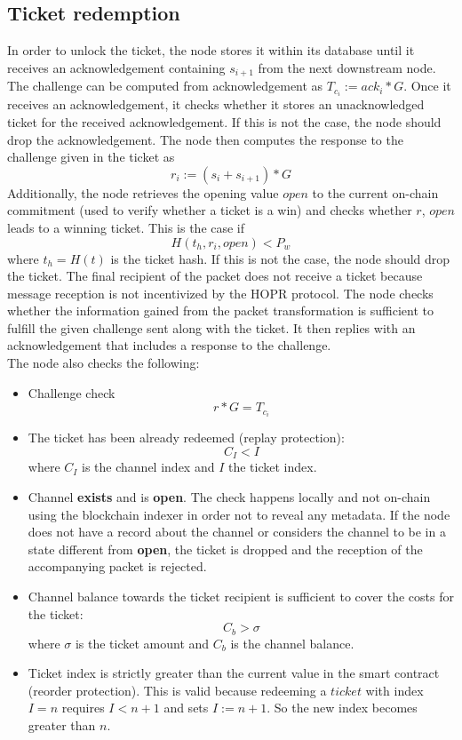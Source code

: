 \subsection{Ticket redemption}


In order to unlock the ticket, the node stores it within its database until it receives an acknowledgement containing $s_{i+1}$ from the next downstream node. 
The challenge can be computed from acknowledgement as $T_{c_i}:=ack_i*G$.
\newline Once it receives an acknowledgement, it checks whether it stores an unacknowledged ticket for the received acknowledgement. 
If this is not the case, the node should drop the acknowledgement.  
\newline The node then computes the response to the challenge given in the ticket as $$r_i:=(s_i+s_{i+1})*G$$
Additionally, the node retrieves the opening value $open$ to the current on-chain commitment (used to verify whether a ticket is a win) and checks whether $r$, $open$ leads to a winning ticket. 
This is the case if $$H(t_h, r_i, open ) <P_w$$ where $t_h=H(t)$ is the ticket hash.
If this is not the case, the node should drop the ticket. 
The final recipient of the packet does not receive a ticket because message reception is not incentivized by the HOPR protocol.
\newline The node checks whether the information gained from the packet transformation is sufficient to fulfill the given challenge sent along with the ticket. It then replies with an acknowledgement that includes a response to the challenge.
\\ The node also checks the following:
\begin{itemize}
    \item Challenge check $$r*G=T_{c_i}$$
    \item The ticket has been already redeemed (replay protection): $$C_I <I$$ where $C_I$ is the channel index and $I$ the ticket index.
    \item Channel \textbf{exists} and is \textbf{open}. The check happens locally and not on-chain using the blockchain indexer in order not to reveal any metadata. If the node does not have a record about the channel or considers the channel to be in a state different from \textbf{open}, the ticket is dropped and the reception of the accompanying packet is rejected.
    \item Channel balance towards the ticket recipient is sufficient to cover the costs for the ticket: $$ C_b>\sigma$$ where $\sigma$ is the ticket amount and $C_b$ is the channel balance. 
    \item Ticket index is strictly greater than the current value in the smart contract (reorder protection). This is valid because redeeming a $ticket$ with index $I=n$ requires $I < n+1$ and sets $I := n+1$. So the new index becomes greater than $n$.


\end{itemize}  








